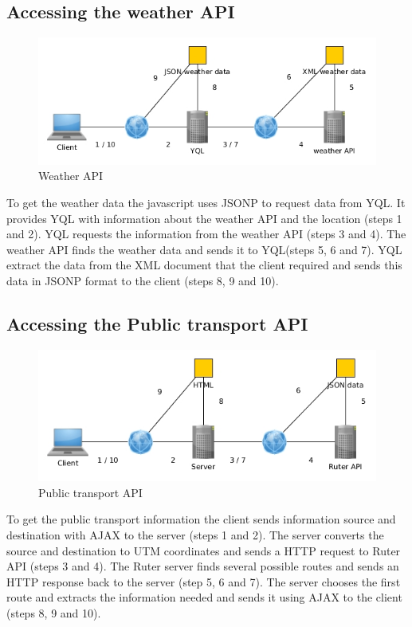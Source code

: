 \documentclass[10pt,a4paper]{article}
\begin{document}
\subsection{Accessing the weather API}
\label{sec:access-weath-api}
\begin{figure}
\centering
\includegraphics[width=\textwidth]{../weather/access}

\caption{Weather API}
\label{fig:weather}
\end{figure}

To get the weather data the javascript uses JSONP to request data from YQL. It provides YQL with information about the weather API and the location (steps 1 and 2). YQL requests the information from the weather API (steps 3 and 4). The weather API finds the weather data and sends it to YQL(steps 5, 6 and 7). YQL extract the data from the XML document that the client required and sends this data in JSONP format to the client (steps 8, 9 and 10).

\subsection{Accessing the Public transport API}
\label{sec:access-publ-transp}
\begin{figure}
\centering
\includegraphics[width=\textwidth]{../ruter/access}
\caption{Public transport API}
\label{fig:public}
\end{figure}
To get the public transport information the client sends information source and destination with AJAX to the server (steps 1 and 2). The server converts the source and destination to UTM coordinates and sends a HTTP request to Ruter API (steps 3 and 4). The Ruter server finds several possible routes and sends an HTTP response back to the server (step 5, 6 and 7). The server chooses the first route and extracts the information needed and sends it using AJAX to the client (steps 8, 9 and 10).
\end{document}
